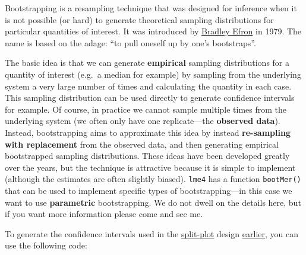 \documentclass[]{book}
\theoremstyle{definition}
\theoremstyle{definition}
\theoremstyle{definition}
\theoremstyle{remark}
\begin{document}
Bootstrapping is a resampling technique that was designed for inference
when it is not possible (or hard) to generate theoretical sampling
distributions for particular quantities of interest. It was introduced
by \href{https://en.wikipedia.org/wiki/Bradley_Efron}{Bradley Efron} in
1979. The name is based on the adage: ``to pull oneself up by one's
bootstraps''.

The basic idea is that we can generate \textbf{empirical} sampling
distributions for a quantity of interest (e.g.~a median for example) by
sampling from the underlying system a very large number of times and
calculating the quantity in each case. This sampling distribution can be
used directly to generate confidence intervals for example. Of course,
in practice we cannot sample multiple times from the underlying system
(we often only have one replicate---the \textbf{observed data}).
Instead, bootstrapping aims to approximate this idea by instead
\textbf{re-sampling with replacement} from the observed data, and then
generating empirical bootstrapped sampling distributions. These ideas
have been developed greatly over the years, but the technique is
attractive because it is simple to implement (although the estimates are
often slightly biased). \texttt{lme4} has a function \texttt{bootMer()}
that can be used to implement specific types of bootstrapping---in this
case we want to use \textbf{parametric} bootstrapping. We do not dwell
on the details here, but if you want more information please come and
see me.

To generate the confidence intervals used in the
\protect\hyperlink{secsplit}{split-plot} design
\protect\hyperlink{splitplot}{earlier}, you can use the following code:
\end{document}
